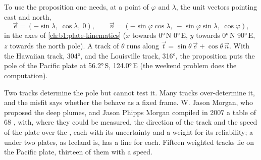 To use the proposition one needs, at a point of  $\varphi$ and 
$\lambda$, the unit vectors pointing east and north,
\[
  \vec e = (-\sin\lambda,\ \cos\lambda,\ 0),\qquad
  \vec n = (-\sin\varphi\cos\lambda,\ -\sin\varphi\sin\lambda,\ \cos\varphi),
\]
in the axes of \cref{ch:b1:plate-kinematics} ($x$ towards \ang{0}\,N
\ang{0}\,E, $y$ towards \ang{0}\,N \ang{90}\,E, $z$ towards the north pole). A
track of  $\theta$ runs along $\vec t = \sin\theta\,\vec e +
\cos\theta\,\vec n$. With the Hawaiian track,  \ang{304}, and the
Louisville track,  \ang{316}, the proposition puts the pole of the
Pacific plate at \ang{56.2}\,S, \ang{124.0}\,E (the weekend problem does the
computation).

Two tracks determine the pole but cannot test it. Many tracks over-determine
it, and the misfit says whether the  behave as a fixed frame. W. Jason
Morgan, who proposed the deep plumes, and Jason Phipps Morgan compiled in 2007
a table of 68 , with, where they could be measured, the direction of
the track and the speed of the plate over the , each with its
uncertainty and a weight for its reliability; a  under two plates, as
Iceland is, has a line for each. Fifteen weighted tracks lie on the Pacific
plate, thirteen of them with a speed.

